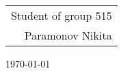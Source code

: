 \begin{frame}{\center{}}
\begin{table}[]
\flushright
\begin{tabular}{r}
\large Student of group 515\\
\large Paramonov Nikita\\
\end{tabular}
\end{table}
\vfill
\center
\today
\end{frame}

